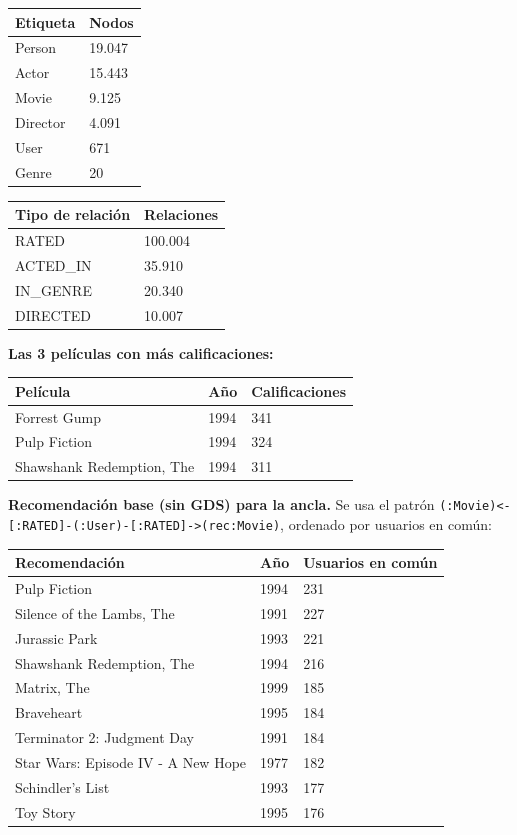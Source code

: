 \documentclass[
  spanish,
  10pt,
]{article}
\newcounter{none} %
\begin{document}
{\def\LTcaptype{none} %
\begin{longtable}[]{@{}ll@{}}
\toprule\noalign{}
Etiqueta & Nodos \\
\midrule\noalign{}
\endhead
\bottomrule\noalign{}
\endlastfoot
Person & 19.047 \\
Actor & 15.443 \\
Movie & 9.125 \\
Director & 4.091 \\
User & 671 \\
Genre & 20 \\
\end{longtable}
}

{\def\LTcaptype{none} %
\begin{longtable}[]{@{}ll@{}}
\toprule\noalign{}
Tipo de relación & Relaciones \\
\midrule\noalign{}
\endhead
\bottomrule\noalign{}
\endlastfoot
RATED & 100.004 \\
ACTED\_IN & 35.910 \\
IN\_GENRE & 20.340 \\
DIRECTED & 10.007 \\
\end{longtable}
}

\textbf{Las 3 películas con más calificaciones:}

{\def\LTcaptype{none} %
\begin{longtable}[]{@{}lll@{}}
\toprule\noalign{}
Película & Año & Calificaciones \\
\midrule\noalign{}
\endhead
\bottomrule\noalign{}
\endlastfoot
Forrest Gump & 1994 & 341 \\
Pulp Fiction & 1994 & 324 \\
Shawshank Redemption, The & 1994 & 311 \\
\end{longtable}
}

\textbf{Recomendación base (sin GDS) para la ancla.} Se usa el patrón
\texttt{(:Movie)\textless{}-{[}:RATED{]}-(:User)-{[}:RATED{]}-\textgreater{}(rec:Movie)},
ordenado por usuarios en común:

{\def\LTcaptype{none} %
\begin{longtable}[]{@{}lll@{}}
\toprule\noalign{}
Recomendación & Año & Usuarios en común \\
\midrule\noalign{}
\endhead
\bottomrule\noalign{}
\endlastfoot
Pulp Fiction & 1994 & 231 \\
Silence of the Lambs, The & 1991 & 227 \\
Jurassic Park & 1993 & 221 \\
Shawshank Redemption, The & 1994 & 216 \\
Matrix, The & 1999 & 185 \\
Braveheart & 1995 & 184 \\
Terminator 2: Judgment Day & 1991 & 184 \\
Star Wars: Episode IV - A New Hope & 1977 & 182 \\
Schindler's List & 1993 & 177 \\
Toy Story & 1995 & 176 \\
\end{longtable}
}
\end{document}
